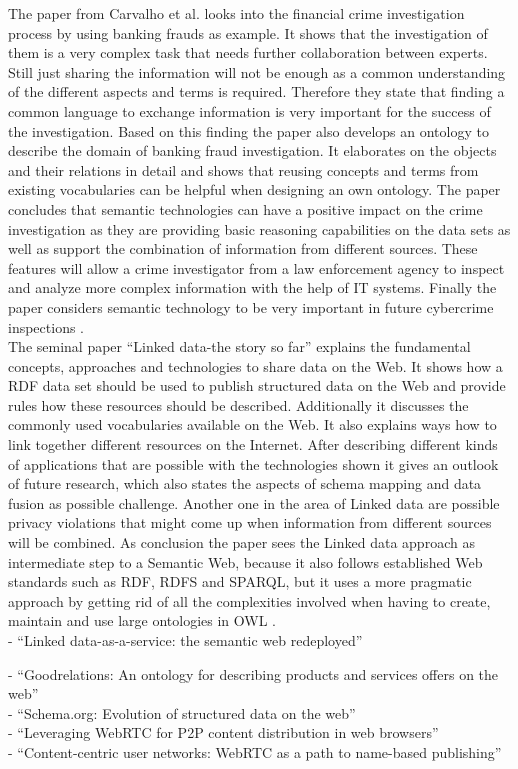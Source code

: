 The paper from Carvalho et al. looks into the financial crime investigation process by using banking frauds as example. It shows that the investigation of them is a very complex task that needs further collaboration between experts. Still just sharing the information will not be enough as a common understanding of the different aspects and terms is required. Therefore they state that finding a common language to exchange information is very important for the success of the investigation. Based on this finding the paper also develops an ontology to describe the domain of banking fraud investigation. It elaborates on the objects and their relations in detail and shows that reusing concepts and terms from existing vocabularies can be helpful when designing an own ontology. The paper concludes that semantic technologies can have a positive impact on the crime investigation as they are providing basic reasoning capabilities on the data sets as well as support the combination of information from different sources. These features will allow a crime investigator from a law enforcement agency to inspect and analyze more complex information with the help of \gls{IT} systems. Finally the paper considers semantic technology to be very important in future cybercrime inspections \citep{carvalhoapplying}. \\

The seminal paper ``Linked data-the story so far'' explains the fundamental concepts, approaches and technologies to share data on the Web. It shows how a \gls{RDF} data set should be used to publish structured data on the Web and provide rules how these resources should be described. Additionally it discusses the commonly used vocabularies available on the Web. It also explains ways how to link together different resources on the Internet. After describing different kinds of applications that are possible with the technologies shown it gives an outlook of future research, which also states the aspects of schema mapping and data fusion as possible challenge. Another one in the area of Linked data are possible privacy violations that might come up when information from different sources will be combined. As conclusion the paper sees the Linked data approach as intermediate step to a Semantic Web, because it also follows established Web standards such as \gls{RDF}, \gls{RDFS} and \gls{SPARQL}, but it uses a more pragmatic approach by getting rid of all the complexities involved when having to create, maintain and use large ontologies in \gls{OWL} \citep{bizer2009linked}. \\

- ``Linked data-as-a-service: the semantic web redeployed'' \citep{rietveld2015linked}

- ``Goodrelations: An ontology for describing products and services offers on the web'' \citep{hepp2008goodrelations} \\
- ``Schema.org: Evolution of structured data on the web'' \citep{guha2016schema} \\
- ``Leveraging WebRTC for P2P content distribution in web browsers'' \citep{vogt2013leveraging} \\
- ``Content-centric user networks: WebRTC as a path to name-based publishing'' \citep{vogt2013content}

